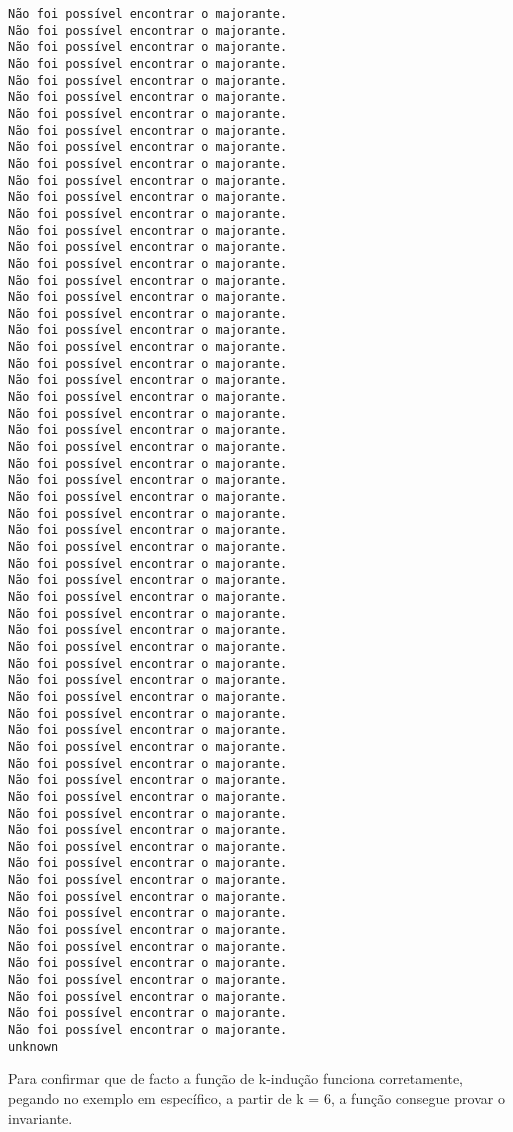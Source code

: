 \documentclass[11pt]{article}
\begin{document}
\begin{Verbatim}[commandchars=\\\{\}]
Não foi possível encontrar o majorante.
Não foi possível encontrar o majorante.
Não foi possível encontrar o majorante.
Não foi possível encontrar o majorante.
Não foi possível encontrar o majorante.
Não foi possível encontrar o majorante.
Não foi possível encontrar o majorante.
Não foi possível encontrar o majorante.
Não foi possível encontrar o majorante.
Não foi possível encontrar o majorante.
Não foi possível encontrar o majorante.
Não foi possível encontrar o majorante.
Não foi possível encontrar o majorante.
Não foi possível encontrar o majorante.
Não foi possível encontrar o majorante.
Não foi possível encontrar o majorante.
Não foi possível encontrar o majorante.
Não foi possível encontrar o majorante.
Não foi possível encontrar o majorante.
Não foi possível encontrar o majorante.
Não foi possível encontrar o majorante.
Não foi possível encontrar o majorante.
Não foi possível encontrar o majorante.
Não foi possível encontrar o majorante.
Não foi possível encontrar o majorante.
Não foi possível encontrar o majorante.
Não foi possível encontrar o majorante.
Não foi possível encontrar o majorante.
Não foi possível encontrar o majorante.
Não foi possível encontrar o majorante.
Não foi possível encontrar o majorante.
Não foi possível encontrar o majorante.
Não foi possível encontrar o majorante.
Não foi possível encontrar o majorante.
Não foi possível encontrar o majorante.
Não foi possível encontrar o majorante.
Não foi possível encontrar o majorante.
Não foi possível encontrar o majorante.
Não foi possível encontrar o majorante.
Não foi possível encontrar o majorante.
Não foi possível encontrar o majorante.
Não foi possível encontrar o majorante.
Não foi possível encontrar o majorante.
Não foi possível encontrar o majorante.
Não foi possível encontrar o majorante.
Não foi possível encontrar o majorante.
Não foi possível encontrar o majorante.
Não foi possível encontrar o majorante.
Não foi possível encontrar o majorante.
Não foi possível encontrar o majorante.
Não foi possível encontrar o majorante.
Não foi possível encontrar o majorante.
Não foi possível encontrar o majorante.
Não foi possível encontrar o majorante.
Não foi possível encontrar o majorante.
Não foi possível encontrar o majorante.
Não foi possível encontrar o majorante.
Não foi possível encontrar o majorante.
Não foi possível encontrar o majorante.
Não foi possível encontrar o majorante.
Não foi possível encontrar o majorante.
Não foi possível encontrar o majorante.
unknown
    \end{Verbatim}

    Para confirmar que de facto a função de k-indução funciona corretamente,
pegando no exemplo em específico, a partir de k = 6, a função consegue
provar o invariante.
\end{document}
